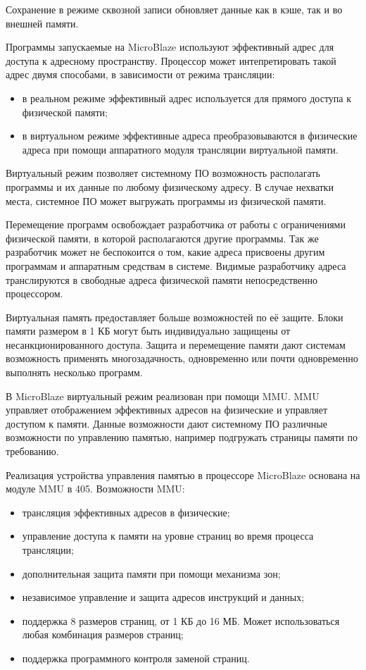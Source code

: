 Сохранение в режиме сквозной записи обновляет данные как в кэше,
так и во внешней памяти.

Программы запускаемые на MicroBlaze используют эффективный адрес для доступа
к адресному пространству. Процессор может интепретировать такой адрес двумя
способами, в зависимости от режима трансляции:
\begin{itemize}
  \item в реальном режиме эффективный адрес используется для прямого доступа к
  физической памяти;
  \item в виртуальном режиме эффективные адреса преобразовываются в физические адреса
  при помощи аппаратного модуля трансляции виртуальной памяти.
\end{itemize}

Виртуальный режим позволяет системному ПО возможность располагать программы и их данные по
любому физическому адресу. В случае нехватки места, системное ПО может выгружать программы
из физической памяти.

Перемещение программ освобождает разработчика от работы с ограничениями физической памяти,
в которой располагаются другие программы. Так же разработчик может не беспокоится
о том, какие адреса присвоены другим программам и аппаратным средствам в системе.
Видимые разработчику адреса транслируются в свободные адреса физической памяти непосредственно
процессором.

Виртуальная память предоставляет больше возможностей по её защите. Блоки памяти размером в
1 КБ могут быть индивидуально защищены от несанкционированного доступа. Защита и перемещение
памяти дают системам возможность применять многозадачность, одновременно или почти одновременно
выполнять несколько программ.

В MicroBlaze виртуальный режим реализован при помощи MMU. MMU управляет отображением
эффективных адресов на физические и управляет доступом к памяти. Данные возможности
дают системному ПО различные возможности по управлению памятью, например подгружать
страницы памяти по требованию.

Реализация устройства управления памятью в процессоре MicroBlaze основана на модуле MMU в  405.
Возможности MMU:
\begin{itemize}
  \item трансляция эффективных адресов в физические;
  \item управление доступа к памяти на уровне страниц во время
    процесса трансляции;
  \item дополнительная защита памяти при помощи механизма зон;
  \item независимое управление и защита адресов инструкций и данных;
  \item поддержка 8 размеров страниц, от 1 КБ до 16 МБ. Может использоваться
    любая комбинация размеров страниц;
  \item поддержка программного контроля заменой страниц.
\end{itemize}

